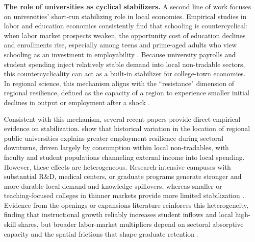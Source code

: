 \noindent \textbf{The role of universities as cyclical stabilizers.} A second line of work focuses on universities' short-run stabilizing role in local economies. Empirical studies in labor and education economics consistently find that schooling is countercyclical: when labor market prospects weaken, the opportunity cost of education declines and enrollments rise, especially among teens and prime-aged adults who view schooling as an investment in employability \citep{dellasBusinessCyclesSchooling2003,bettsSafePortStorm1995}. Because university payrolls and student spending inject relatively stable demand into local non-tradable sectors, this countercyclicality can act as a built-in stabilizer for college-town economies. In regional science, this mechanism aligns with the ``resistance" dimension of regional resilience, defined as the capacity of a region to experience smaller initial declines in output or employment after a shock \citep{martinNotionRegionalEconomic2015,martinRegionalEconomicResilience2012}. 

\noindent Consistent with this mechanism, several recent papers provide direct empirical evidence on stabilization. \citet{howardUniversitiesImproveLocal2024} show that historical variation in the location of regional public universities explains greater employment resilience during sectoral downturns, driven largely by consumption within local non-tradables, with faculty and student populations channeling external income into local spending. However, these effects are heterogeneous. Research-intensive campuses with substantial R\&D, medical centers, or graduate programs generate stronger and more durable local demand and knowledge spillovers, whereas smaller or teaching-focused colleges in thinner markets provide more limited stabilization \citep{howardUniversitiesImproveLocal2024,beesonEffectsCollegesUniversities}. Evidence from the openings or expansions literature reinforces this heterogeneity, finding that instructional growth reliably increases student inflows and local high-skill shares, but broader labor-market multipliers depend on sectoral absorptive capacity and the spatial frictions that shape graduate retention \citep{berlingieriCollegeOpeningsLocal2022,ferhatImpactUniversityOpenings,amendolaDoesGraduateHuman2020}.


